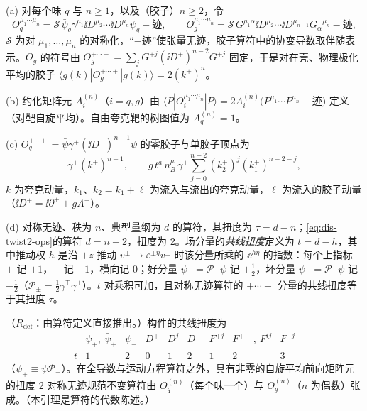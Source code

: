 \begin{definition}[扭度与扭度 2 算符]\label{def:dis-twist}
(a) 对每个味 $q$ 与 $n\ge1$，以及（胶子）$n\ge2$，令
\begin{equation}\label{eq:dis-twist2-ops}
O_q^{\mu_1\cdots\mu_n}=\mathcal S\,\bar\psi_q\gamma^{\mu_1}\ii D^{\mu_2}\cdots\ii D^{\mu_n}\psi_q-\text{迹},\qquad
O_g^{\mu_1\cdots\mu_n}=\mathcal S\,G^{\mu_1\alpha}\ii D^{\mu_2}\cdots\ii D^{\mu_{n-1}}G_\alpha{}^{\mu_n}-\text{迹},
\end{equation}
$\mathcal S$ 为对 $\mu_1,\dots,\mu_n$ 的对称化，“$-$迹”使张量无迹，胶子算符中的协变导数取伴随表示。$O_g$ 的符号由 $O_g^{+\cdots+}=\sum_jG^{+j}(\ii D^+)^{n-2}G^{+j}$ 固定，于是对在壳、物理极化平均的胶子 $\langle g(k)|O_g^{+\cdots+}|g(k)\rangle=2(k^+)^n$。%
\par
(b) 约化矩阵元 $A^{(n)}_i$（$i=q,g$）由 $\langle P|O_i^{\mu_1\cdots\mu_n}|P\rangle=2A^{(n)}_i\big(P^{\mu_1}\cdots P^{\mu_n}-\text{迹}\big)$ 定义（对靶自旋平均）。自由夸克靶的树图值为 $A^{(n)}_q=1$。
\par
(c) $O_q^{+\cdots+}=\bar\psi\gamma^+(\ii D^+)^{n-1}\psi$ 的零胶子与单胶子顶点为
\begin{equation}\label{eq:dis-Oq-vertex}
\gamma^+(k^+)^{n-1},\qquad g\,t^a\,n_B^\mu\,\gamma^+\sum_{j=0}^{n-2}(k_2^+)^j(k_1^+)^{n-2-j},
\end{equation}
$k$ 为夸克动量，$k_1$、$k_2=k_1+\ell$ 为流入与流出的夸克动量，$\ell$ 为流入的胶子动量（$\ii D^+=\ii\partial^++gA^+$）。%
\par
(d) 对称无迹、秩为 $n$、典型量纲为 $d$ 的算符，其扭度为 $\tau=d-n$；\cref{eq:dis-twist2-ops}的算符 $d=n+2$，扭度为 2。场分量的\emph{共线扭度}定义为 $t=d-h$，其中推动权 $h$ 是沿 $+z$ 推动 $v^\pm\to\ee^{\pm\eta}v^\pm$ 时该分量所乘的 $\ee^{h\eta}$ 的指数：每个上指标 $+$ 记 $+1$，$-$ 记 $-1$，横向记 $0$；好分量 $\psi_+=\mathcal P_+\psi$ 记 $+\frac12$，坏分量 $\psi_-=\mathcal P_-\psi$ 记 $-\frac12$（$\mathcal P_\pm=\frac12\gamma^\mp\gamma^\pm$）。$t$ 对乘积可加，且对称无迹算符的 $+\cdots+$ 分量的共线扭度等于其扭度 $\tau$。
\end{definition}

\begin{lemma}\label{lem:dis-twist-classification}
（$R_{\mathrm{def}}$：由算符定义直接推出。）构件的共线扭度为
\begin{equation}\label{eq:dis-twist-table}
\begin{array}{c|cccccccc}
 & \psi_+,\ \bar\psi_+ & \psi_- & D^+ & D^j & D^- & F^{+j} & F^{+-},\ F^{ij} & F^{-j}\\\hline
t & 1 & 2 & 0 & 1 & 2 & 1 & 2 & 3
\end{array}
\end{equation}
（$\bar\psi_+\equiv\bar\psi\mathcal P_-$）。在全导数与运动方程算符之外，具有非零的自旋平均前向矩阵元的扭度 2 对称无迹规范不变算符由 $O^{(n)}_q$（每个味一个）与 $O^{(n)}_g$（$n$ 为偶数）张成。（本引理是算符的代数陈述。）
\end{lemma}

